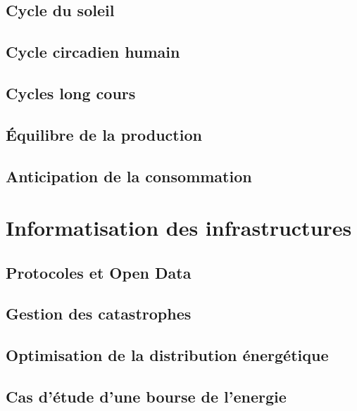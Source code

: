 \section{Cycle du soleil}
\lipsum
\section{Cycle circadien humain}
\lipsum
\section{Cycles long cours}
\lipsum
\section{Équilibre de la production}
\lipsum
\section{Anticipation de la consommation}
\lipsum



\chapter{Informatisation des infrastructures}
\section{Protocoles et Open Data}
\lipsum
\section{Gestion des catastrophes}
\lipsum
\section{Optimisation de la distribution énergétique}
\lipsum
\section{Cas d'étude d'une bourse de l'energie}
\lipsum

